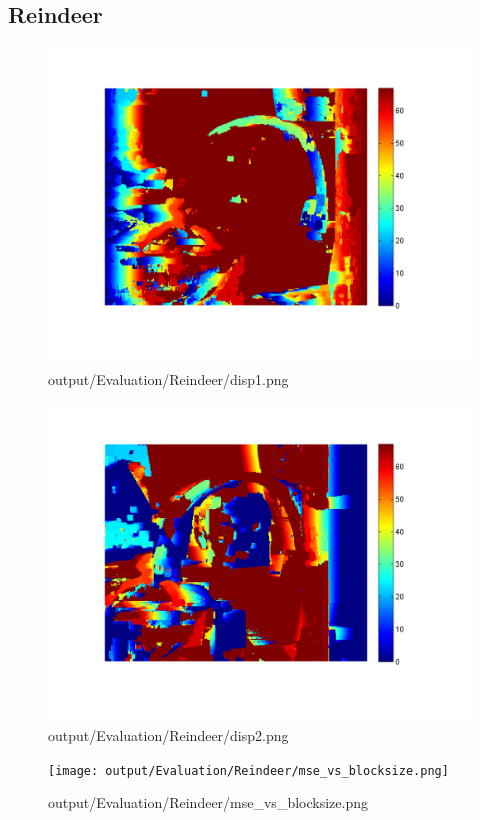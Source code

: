 \subsection{Reindeer}
\begin{figure}[h]    \includegraphics[scale=0.5]{output/Evaluation/Reindeer/disp1.png}    \caption{output/Evaluation/Reindeer/disp1.png}\end{figure}
\begin{figure}[h]    \includegraphics[scale=0.5]{output/Evaluation/Reindeer/disp2.png}    \caption{output/Evaluation/Reindeer/disp2.png}\end{figure}
\begin{figure}[h]    \texttt{[image: output/Evaluation/Reindeer/mse\_vs\_blocksize.png]}    \caption{output/Evaluation/Reindeer/mse\_vs\_blocksize.png}\end{figure}
